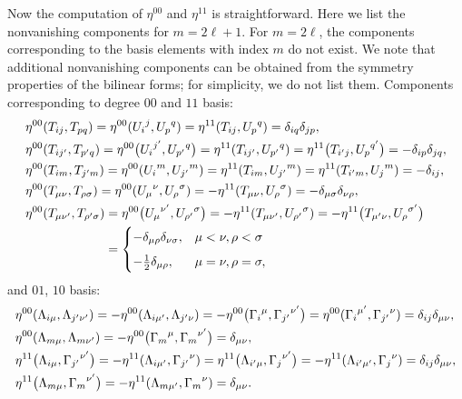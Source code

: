 \documentclass[pdftex]{sigma}
\numberwithin{equation}{section}
\theoremstyle{definition}
\begin{document}
Now the computation of $\eta^{00}$ and $\eta^{11}$ is straightforward. Here we list the nonvanishing components for $m = 2\ell + 1$. For $m = 2\ell$, the components corresponding to the basis elements with index $m$ do not exist. We note that additional nonvanishing components can be obtained from the symmetry properties of the bilinear forms; for simplicity, we do not list them.
Components corresponding to degree $00$ and $11$ basis:
\begin{align}
&	\eta^{00}(T_{ij},T_{pq})= \eta^{00}({U_i}^j, {U_p}^q) = \eta^{11}(T_{ij},{U_p}^q) = \delta_{iq} \delta_{jp},
	\notag\\
&	\eta^{00}(T_{ij'}, T_{p'q})= \eta^{00}\bigl({U_i}^{j'}, {U_{p'}}^{q}\bigr) = \eta^{11}(T_{ij'},{U_{p'}}^q) = \eta^{11}\bigl(T_{i'j},{U_p}^{q'}\bigr) = -\delta_{ip} \delta_{jq},
	\notag \\
	&\eta^{00}(T_{im}, T_{j'm})= \eta^{00}({U_i}^m,{U_{j'}}^m) = \eta^{11}(T_{im},{U_{j'}}^m) = \eta^{11}(T_{i'm}, {U_j}^m) = -\delta_{ij},
	\notag \\
	&\eta^{00}(T_{\mu\nu}, T_{\rho\sigma})= \eta^{00}({U_{\mu}}^{\nu},{U_{\rho}}^{\sigma}) = -\eta^{11}(T_{\mu\nu},{U_{\rho}}^{\sigma})= -\delta_{\mu\sigma} \delta_{\nu\rho},
	\notag\\
	&\eta^{00}(T_{\mu\nu'}, T_{\rho'\sigma})= \eta^{00}\bigl({U_{\mu}}^{\nu'},{U_{\rho'}}^{\sigma}\bigr) = -\eta^{11}(T_{\mu\nu'},{U_{\rho'}}^{\sigma}) =
	-\eta^{11}\bigl(T_{\mu'\nu},{U_{\rho}}^{\sigma'}\bigr)
	\notag\\
	&\hphantom{\eta^{00}(T_{\mu\nu'}, T_{\rho'\sigma})}{}
=
	\begin{cases}
		-\delta_{\mu\rho} \delta_{\nu\sigma}, & \mu < \nu, \rho < \sigma
		\\[5pt]
		-\frac{1}{2} \delta_{\mu\rho}, & \mu = \nu, \rho=\sigma,
	\end{cases}
	\label{BFosp1}
\end{align}
and $01$, $10$ basis:
\begin{align}
&	\eta^{00}(\Lambda_{i\mu}, \Lambda_{j'\nu'})= -\eta^{00}(\Lambda_{i\mu'}, \Lambda_{j'\nu}) = -\eta^{00}\bigl({\Gamma_i}^{\mu}, {\Gamma_{j'}}^{\nu'}\bigr) = \eta^{00}({\Gamma_i}^{\mu'}, {\Gamma_{j'}}^{\nu}) = \delta_{ij}\delta_{\mu\nu},
	\notag\\
&	\eta^{00}(\Lambda_{m\mu}, \Lambda_{m\nu'})= -\eta^{00}\bigl({\Gamma_m}^{\mu}, {\Gamma_m}^{\nu'}\bigr) = \delta_{\mu\nu},
	\notag\\
&	\eta^{11}\bigl(\Lambda_{i\mu},{\Gamma_{j'}}^{\nu'}\bigr)= -\eta^{11}(\Lambda_{i\mu'},{\Gamma_{j'}}^{\nu}) = \eta^{11}\bigl(\Lambda_{i'\mu},{\Gamma_{j}}^{\nu'}\bigr) = -\eta^{11}(\Lambda_{i'\mu'},{\Gamma_j}^{\nu}) = \delta_{ij} \delta_{\mu\nu},
	\notag\\
	&\eta^{11}\bigl(\Lambda_{m\mu},{\Gamma_m}^{\nu'}\bigr)=-\eta^{11}(\Lambda_{m\mu'},{\Gamma_m}^{\nu}) = \delta_{\mu\nu}.
	\label{BFosp2}
\end{align}
\end{document}
